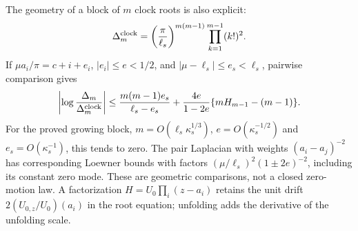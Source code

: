 The geometry of a block of $m$ clock roots is also explicit:
\begin{equation}
 \Delta_m^{\rm clock}
   =\left(\frac\pi{\ell_s}\right)^{m(m-1)}
                         \prod_{k=1}^{m-1}(k!)^2.
 \label{eq:clock-vandermonde}
\end{equation}
If $\mu a_i/\pi=c+i+e_i$, $|e_i|\le e<1/2$, and
$|\mu-\ell_s|\le e_s<\ell_s$, pairwise comparison gives
\begin{equation}
 \left|\log\frac{\Delta_m}{\Delta_m^{\rm clock}}\right|
 \le\frac{m(m-1)e_s}{\ell_s-e_s}
   +\frac{4e}{1-2e}\{mH_{m-1}-(m-1)\}.
 \label{eq:vandermonde-error}
\end{equation}
For the proved growing block, $m=O(\ell_s\kappa_s^{1/3})$,
$e=O(\kappa_s^{-1/2})$ and $e_s=O(\kappa_s^{-1})$, this tends to zero.
The pair Laplacian with weights $(a_i-a_j)^{-2}$ has corresponding
Loewner bounds with factors $(\mu/\ell_s)^2(1\pm2e)^{-2}$,
including its constant zero mode. These are geometric comparisons,
not a closed zero-motion law. A factorization $H=U_0\prod_i(z-a_i)$
retains the unit drift $2(U_{0,z}/U_0)(a_i)$ in the root equation;
unfolding adds the derivative of the unfolding scale.

